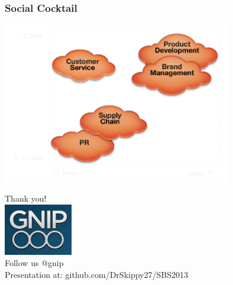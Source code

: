 \documentclass{beamer}
\begin{document}

\begin{frame}\frametitle{Social Cocktail}
  \begin{center}
    \includegraphics[width=10cm]{./imgs/socialcocktailgrid.png}
  \end{center}
\end{frame}



\begin{frame}
  \begin{center}
  \Large{Thank you!  \\ [20pt]}
    \includegraphics[width=3cm]{./imgs/logo.png} \\ [15pt]
   \Large{Follow us @gnip \\ [10pt] Presentation at: github.com/DrSkippy27/SBS2013 }
  \end{center}
\end{frame}
\end{document}
